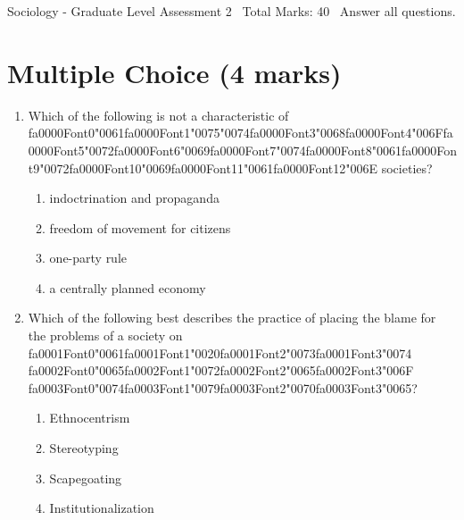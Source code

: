 \documentclass[12pt]{article}
\begin{document}
\begin{center}
Sociology - Graduate Level Assessment 2 \
Total Marks: 40 \
Answer all questions.
\end{center}

\section*{Multiple Choice (4 marks)}
\begin{enumerate}[label=\arabic*.]
\item Which of the following is not a characteristic of {\csname fa0000Font0\endcsname\char"0061}{\csname fa0000Font1\endcsname\char"0075}{\char"0074}{\csname fa0000Font3\endcsname\char"0068}{\csname fa0000Font4\endcsname\char"006F}{\csname fa0000Font5\endcsname\char"0072}{\csname fa0000Font6\endcsname\char"0069}{\csname fa0000Font7\endcsname\char"0074}{\csname fa0000Font8\endcsname\char"0061}{\csname fa0000Font9\endcsname\char"0072}{\csname fa0000Font10\endcsname\char"0069}{\csname fa0000Font11\endcsname\char"0061}{\csname fa0000Font12\endcsname\char"006E} societies?
\begin{enumerate}[label=(\alph*)]
    \item indoctrination and propaganda
    \item freedom of movement for citizens
    \item one-party rule
    \item a centrally planned economy
\end{enumerate}
\item Which of the following best describes the practice of placing the blame for the problems of a society on {\csname fa0001Font0\endcsname\char"0061}{\csname fa0001Font1\endcsname\char"0020}{\csname fa0001Font2\endcsname\char"0073}{\csname fa0001Font3\endcsname\char"0074} {\csname fa0002Font0\endcsname\char"0065}{\csname fa0002Font1\endcsname\char"0072}{\csname fa0002Font2\endcsname\char"0065}{\csname fa0002Font3\endcsname\char"006F} {\csname fa0003Font0\endcsname\char"0074}{\csname fa0003Font1\endcsname\char"0079}{\csname fa0003Font2\endcsname\char"0070}{\csname fa0003Font3\endcsname\char"0065}?
\begin{enumerate}[label=(\alph*)]
    \item Ethnocentrism
    \item Stereotyping
    \item Scapegoating
    \item Institutionalization
\end{enumerate}
\end{enumerate}
\end{document}
